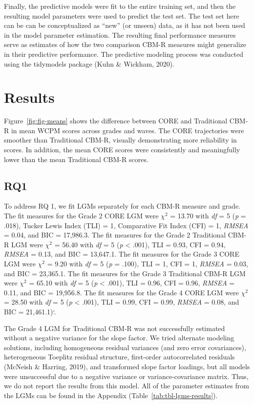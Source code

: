 \documentclass[
  english,
  man, fleqn, noextraspace]{apa6}
\begin{document}
Finally, the predictive models were fit to the entire training set, and then the resulting model parameters were used to predict the test set. The test set here can be can be conceptualized as ``new'' (or unseen) data, as it has not been used in the model parameter estimation. The resulting final performance measures serve as estimates of how the two comparison CBM-R measures might generalize in their predictive performance. The predictive modeling process was conducted using the tidymodels package (Kuhn \& Wickham, 2020).

\hypertarget{results}{%
\section{Results}\label{results}}

Figure~\ref{fig:fig-means} shows the difference between CORE and Traditional CBM-R in mean WCPM scores across grades and waves. The CORE trajectories were smoother than Traditional CBM-R, visually demonstrating more reliability in scores. In addition, the mean CORE scores were consistently and meaningfully lower than the mean Traditional CBM-R scores.

\hypertarget{rq1}{%
\subsection{RQ1}\label{rq1}}

To address RQ 1, we fit LGMs separately for each CBM-R measure and grade. The fit measures for the Grade 2 CORE LGM were \(\chi^2\) = 13.70 with \emph{df} = 5 (\emph{p} = .018), Tucker Lewis Index (TLI) = 1, Comparative Fit Index (CFI) = 1, \emph{RMSEA} = 0.04, and BIC = 17,986.3. The fit measures for the Grade 2 Traditional CBM-R LGM were \(\chi^2\) = 56.40 with \emph{df} = 5 (\emph{p} \textless{} .001), TLI = 0.93, CFI = 0.94, \emph{RMSEA} = 0.13, and BIC = 13,647.1. The fit measures for the Grade 3 CORE LGM were \(\chi^2\) = 9.20 with \emph{df} = 5 (\emph{p} = .100), TLI = 1, CFI = 1, \emph{RMSEA} = 0.03, and BIC = 23,365.1. The fit measures for the Grade 3 Traditional CBM-R LGM were \(\chi^2\) = 65.10 with \emph{df} = 5 (\emph{p} \textless{} .001), TLI = 0.96, CFI = 0.96, \emph{RMSEA} = 0.11, and BIC = 19,956.8. The fit measures for the Grade 4 CORE LGM were \(\chi^2\) = 28.50 with \emph{df} = 5 (\emph{p} \textless{} .001), TLI = 0.99, CFI = 0.99, \emph{RMSEA} = 0.08, and BIC = 21,461.1)`.

The Grade 4 LGM for Traditional CBM-R was not successfully estimated without a negative variance for the slope factor. We tried alternate modeling solutions, including homogeneous residual variances (and zero error covariances), heterogeneous Toeplitz residual structure, first-order autocorrelated residuals (McNeish \& Harring, 2019), and transformed slope factor loadings, but all models were unsuccessful due to a negative variance or variance-covariance matrix. Thus, we do not report the results from this model. All of the parameter estimates from the LGMs can be found in the Appendix (Table~\ref{tab:tbl-lgms-results}).
\end{document}
